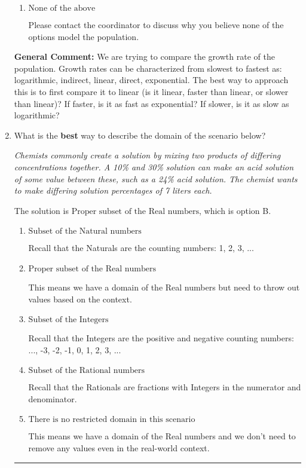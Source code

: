 \documentclass{extbook}[14pt]
\newcommand{\litem}[1]{\item #1

\rule{\textwidth}{0.4pt}}
\begin{document}
\begin{enumerate}
{\begin{enumerate}[label=\Alph*.]
This suggests the slowest of growths that we know.
\item \( \text{None of the above} \)

Please contact the coordinator to discuss why you believe none of the options model the population.
\end{enumerate}

\textbf{General Comment:} We are trying to compare the growth rate of the population. Growth rates can be characterized from slowest to fastest as: logarithmic, indirect, linear, direct, exponential. The best way to approach this is to first compare it to linear (is it linear, faster than linear, or slower than linear)? If faster, is it as fast as exponential? If slower, is it as slow as logarithmic?
}
\litem{
What is the \textbf{best} way to describe the domain of the scenario below?

\begin{center}
    \textit{ Chemists commonly create a solution by mixing two products of differing concentrations together. A 10\% and 30\% solution can make an acid solution of some value between these, such as a 24\% acid solution. The chemist wants to make differing solution percentages of 7 liters each. }
\end{center}
The solution is \( \text{Proper subset of the Real numbers} \), which is option B.\begin{enumerate}[label=\Alph*.]
\item \( \text{Subset of the Natural numbers} \)

Recall that the Naturals are the counting numbers: 1, 2, 3, ...
\item \( \text{Proper subset of the Real numbers} \)

This means we have a domain of the Real numbers but need to throw out values based on the context.
\item \( \text{Subset of the Integers} \)

Recall that the Integers are the positive and negative counting numbers: ..., -3, -2, -1, 0, 1, 2, 3, ... 
\item \( \text{Subset of the Rational numbers} \)

Recall that the Rationals are fractions with Integers in the numerator and denominator.
\item \( \text{There is no restricted domain in this scenario} \)

This means we have a domain of the Real numbers and we don't need to remove any values even in the real-world context.
\end{enumerate}

}
\end{enumerate}
\end{document}
